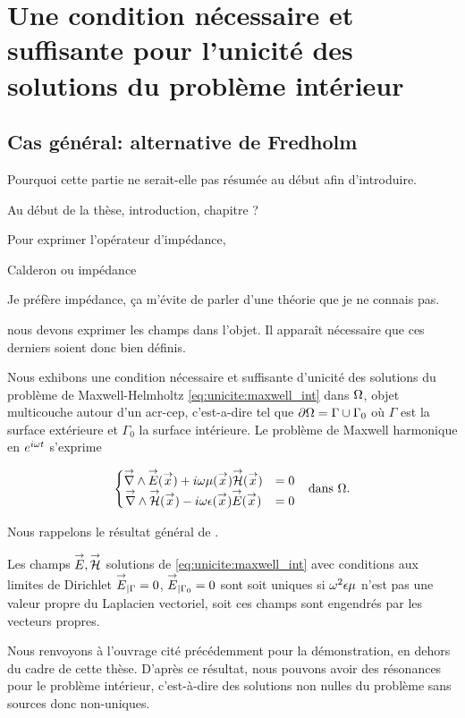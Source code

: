 \section[Une CNS pour l'unicité des solutions de Maxwell intérieur]{Une condition nécessaire et suffisante pour l'unicité des solutions du problème intérieur}
  \subsection{Cas général: alternative de Fredholm}

    \begin{REM}
      Pourquoi cette partie ne serait-elle pas résumée au début afin d'introduire.
    \end{REM}
    \begin{REP}
      Au début de la thèse, introduction, chapitre ?
    \end{REP}

    Pour exprimer l'opérateur d'impédance,
    \begin{REM}
      Calderon ou impédance
    \end{REM}
    \begin{REP}
      Je préfère impédance, ça m'évite de parler d'une théorie que je ne connais pas.
    \end{REP}
    nous devons exprimer les champs dans l'objet. Il apparaît nécessaire que ces derniers soient donc bien définis.

    Nous exhibons une condition nécessaire et suffisante d'unicité des solutions du problème de Maxwell-Helmholtz  \eqref{eq:unicite:maxwell_int} dans \(\Omega\), objet multicouche autour d'un \gls{acr-cep}, c'est-a-dire tel que \(\partial \Omega = \Gamma \cup \Gamma_0\) où \(\Gamma\) est la surface extérieure et \(\Gamma_0\) la surface intérieure. Le problème de Maxwell harmonique en \(e^{i\omega t}\) s'exprime

    \begin{align}
    \left\lbrace
      \begin{matrix}
        {\overset{\rightarrow}{\nabla}}\wedge {\overset{\rightarrow}{E}}({\overset{\rightarrow}{x}}) + i \omega\mu({\overset{\rightarrow}{x}}) {\overset{\rightarrow}{\mathcal{H}}}({\overset{\rightarrow}{x}}) &= 0
        \\
        {\overset{\rightarrow}{\nabla}}\wedge {\overset{\rightarrow}{\mathcal{H}}}({\overset{\rightarrow}{x}}) - i \omega\epsilon({\overset{\rightarrow}{x}}) {\overset{\rightarrow}{E}}({\overset{\rightarrow}{x}}) &= 0
      \end{matrix}
      \right. && \text{dans \(\Omega\).}
      \label{eq:unicite:maxwell_int}
    \end{align}

    Nous rappelons le résultat général de \cite[Théorème~8, p.~111]{cessenat_mathematical_1996}.
    \begin{thm}
      Les champs \({\overset{\rightarrow}{E}},{\overset{\rightarrow}{\mathcal{H}}}\) solutions de \eqref{eq:unicite:maxwell_int} avec conditions aux limites de Dirichlet \({\overset{\rightarrow}{E}}_{|\Gamma} = 0\), \({\overset{\rightarrow}{E}}_{|\Gamma_0} = 0\) sont soit uniques si \(\omega^2\epsilon\mu\) n'est pas une valeur propre du Laplacien vectoriel, soit ces champs sont engendrés par les vecteurs propres.
    \end{thm}
    Nous renvoyons à l'ouvrage cité précédemment pour la démonstration, en dehors du cadre de cette thèse.
    D'après ce résultat, nous pouvons avoir des résonances pour le problème intérieur, c'est-à-dire des solutions non nulles du problème sans sources donc non-uniques.

